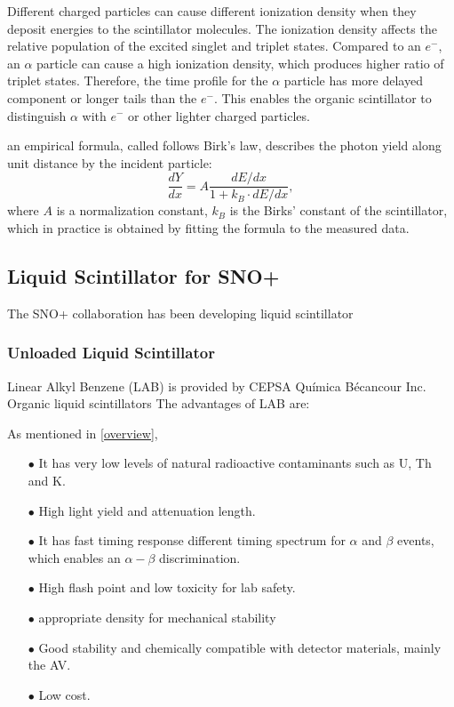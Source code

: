 Different charged particles can cause different ionization density when they deposit energies to the scintillator molecules. The ionization density affects the relative population of the excited singlet and triplet states. Compared to an $e^-$, an $\alpha$ particle can cause a high ionization density, which produces higher ratio of triplet states. Therefore, the time profile for the $\alpha$ particle has more delayed component or longer tails than the $e^-$. This enables the organic scintillator to distinguish $\alpha$ with $e^-$ or other lighter charged particles\cite{dunger2018topological, scintillatorPaper}. 

an empirical formula, called follows Birk's law\cite{birks1951scintillations, birks1965theory}, describes the photon yield along unit distance by the incident particle:
\[
\frac{dY}{dx}=A\frac{dE/dx}{1+k_B\cdot dE/dx},
\]
where $A$ is a normalization constant, $k_B$ is the Birks' constant of the scintillator, which in practice is obtained by fitting the formula to the measured data.


\subsection{Liquid Scintillator for SNO+}

The SNO+ collaboration has been developing liquid scintillator 

\subsubsection{Unloaded Liquid Scintillator}
Linear Alkyl Benzene (LAB)
is provided by CEPSA Qu\'{i}mica B\'ecancour Inc.
Organic liquid scintillators 
The advantages of LAB are:

As mentioned in \ref{overview}, 


\begin{itemize}
	\item[$\bullet$] It has very low levels of natural radioactive contaminants such as U, Th and K.
	\item[$\bullet$] High light yield and attenuation length.
	\item[$\bullet$] It has fast timing response 
	different timing spectrum for $\alpha$ and $\beta$ events, which enables an $\alpha-\beta$ discrimination. 
	\item[$\bullet$] High flash point and low toxicity for lab safety.
	\item[$\bullet$] appropriate density for mechanical stability
	\item[$\bullet$] Good stability and chemically compatible with detector materials, mainly the AV.
	\item[$\bullet$] Low cost.
\end{itemize}


